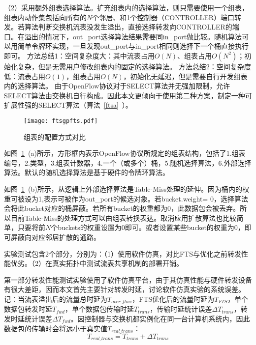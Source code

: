（2）采用额外组表选择算法。扩充组表内的选择算法，则只需要使用一个组表，组表内动作集包括向所有的$N$个邻居、和1个控制器（CONTROLLER）端口转发。若算法判断交换机流表没发生溢出，直接选择转发向CONTROLLER的端口。在溢出的情况下，out\_port选择算法结果需要同in\_port做比较。随机算法可以用简单令牌环实现，一旦发现out\_port与in\_port相同则选择下一个桶直接执行即可。
方法总结1：空间复杂度大：其中流表占用$O(N)$、组表占用$O(N^2)$；初始化复杂，但是无需用户修改组表内的固定的选择算法。
方法总结2：空间复杂度低：流表占用$O(1)$，组表占用$O(N)$，初始化无延迟，但是需要自行开发组表内的选择算法。
由于OpenFlow协议对于SELECT算法并无强加限制，允许SELECT算法由交换机自行构成。因此本文更倾向于使用第二种方案，制定一种可扩展性强的SELECT算法（算法~\ref{ftsa}~）。



\begin{figure}[!ht]
	\centering 
	\vspace{-1.5mm} 
	\texttt{[image: ftsgpfts.pdf]}
	\caption{组表的配置方式对比} \label{fig:ftsgpfts}
\end{figure}

如图~\ref{fig:ftsgpfts}~(a)所示，方形框内表示OpenFlow协议所规定的组表结构，包括了1.组表编号，2.类型，3.组表计数器，4.一个（或多个）桶，5.随机选择算法，6.外部选择算法。默认的随机选择算法是基于硬件的令牌环算法。

如图~\ref{fig:ftsgpfts}~(b)所示，从逻辑上外部选择算法是Table-Miss处理的延伸。因为桶内的权重可被设为1,表示可被作为out\_port的候选对象。若bucket.weight= 0，选择算法会将此bucket对应的桶屏蔽。若所有bucket的权重都为0，此数据包会被丢弃。所以目前Table-Miss的处理方式可以由组表转换表达。取消应用扩散算法也比较简单，只要将前$ N $个buckets的权重设置为0即可。或者设置某些bucket的权重为0，即可屏蔽向对应邻居扩散的通路。





\label{chapftsevaluation}

实验测试包含2个部分，分别为：（1）使用软件仿真，对比FTS与优化之前转发性能优劣。（2）在真实拓扑中测试流表共享机制的部署开销。

第一部分转发性能测试实验使用了软件仿真平台，由于其仿真性能与硬件转发设备有很大差距，因而本文首先主要针对转发时延，讨论软件仿真实验的系统误差。记：当流表溢出后的流量总时延为$T_{over\_flow}$，FTS优化后的流量时延为$T_{FTS}$，单个数据包转发时延$T_{fwd}$，单个数据包传输时延$T_{trans}$，传输时延统计误差$\Delta T_{trans}$，转发时延统计误差$\Delta T_{fwd}$。因控制器与交换机都实例化在同一台计算机系统内，因此数据包的传输时会将远小于真实值$T_{real\_trans}$：
\begin{equation}\label{fts7}
T_{real\_trans} = T_{trans} + \Delta T_{trans}
\end{equation}

